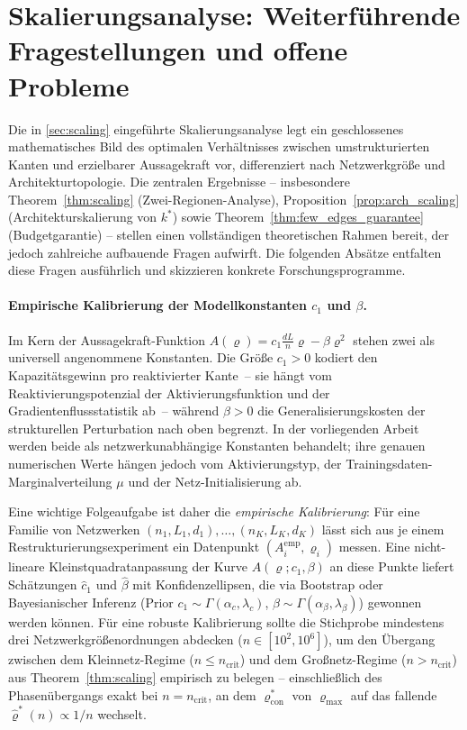 \documentclass[12pt, a4paper, openany]{report}
\begin{document}
\section{Skalierungsanalyse: Weiterführende Fragestellungen und offene Probleme}
\label{sec:outlook_scaling}

Die in \cref{sec:scaling} eingeführte Skalierungsanalyse legt ein geschlossenes
mathematisches Bild des optimalen Verhältnisses zwischen umstrukturierten
Kanten und erzielbarer Aussagekraft vor, differenziert nach Netzwerkgröße und
Architekturtopologie.  Die zentralen Ergebnisse -- insbesondere
Theorem~\ref{thm:scaling} (Zwei-Regionen-Analyse), Proposition~\ref{prop:arch_scaling}
(Architekturskalierung von $k^*$) sowie Theorem~\ref{thm:few_edges_guarantee}
(Budgetgarantie) -- stellen einen vollständigen theoretischen Rahmen bereit,
der jedoch zahlreiche auf\-bau\-ende Fragen aufwirft.  Die folgenden Absätze
entfalten diese Fragen ausführlich und skizzieren konkrete Forschungsprogramme.

\paragraph{Empirische Kalibrierung der Modellkonstanten $c_1$ und $\beta$.}
Im Kern der Aussage\-kraft-Funktion $A(\varrho) = c_1 \frac{dL}{n}\varrho - \beta\varrho^2$
stehen zwei als universell angenommene Konstanten.  Die Größe $c_1 > 0$
kodiert den Kapazitätsgewinn pro reaktivierter Kante~-- sie hängt vom
Reaktivierungspotenzial der Aktivierungsfunktion und der Gradientenfluss\-statistik
ab~-- während $\beta > 0$ die Generalisierungskosten der strukturellen
Perturbation nach oben begrenzt.  In der vorliegenden Arbeit werden beide
als netzwerkunabhängige Konstanten behandelt; ihre genauen numerischen Werte
hängen jedoch vom Aktivierungstyp, der Trainingsdaten-Marginalverteilung
$\mu$ und der Netz-Initialisierung ab.

Eine wichtige Folgeaufgabe ist daher die \emph{empirische Kalibrierung}:
Für eine Familie von Netzwerken $(n_1, L_1, d_1),\ldots,(n_K, L_K, d_K)$
lässt sich aus je einem Restrukturierungsexperiment ein Datenpunkt
$(A_i^{\mathrm{emp}}, \varrho_i)$ messen.  Eine nicht-lineare Kleinstquadrat\-anpassung
der Kurve $A(\varrho; c_1, \beta)$ an diese Punkte liefert Schätzungen
$\hat{c}_1$ und $\hat\beta$ mit Konfidenzellipsen, die via Bootstrap oder
Bayesianischer Inferenz (Prior $c_1 \sim \Gamma(\alpha_c, \lambda_c)$,
$\beta \sim \Gamma(\alpha_\beta, \lambda_\beta)$) gewonnen werden können.
Für eine robuste Kalibrierung sollte die Stichprobe mindestens drei
Netzwerkgrößen\-ordnungen abdecken ($n \in [10^2, 10^6]$), um den Übergang
zwischen dem Kleinnetz-Regime ($n \leq n_{\mathrm{crit}}$) und dem
Großnetz-Regime ($n > n_{\mathrm{crit}}$) aus Theorem~\ref{thm:scaling}
empirisch zu belegen -- einschließlich des Phasenübergangs exakt bei
$n = n_{\mathrm{crit}}$, an dem $\varrho^*_{\mathrm{con}}$ von $\varrho_{\max}$
auf das fallende $\hat\varrho^*(n) \propto 1/n$ wechselt.
\end{document}

